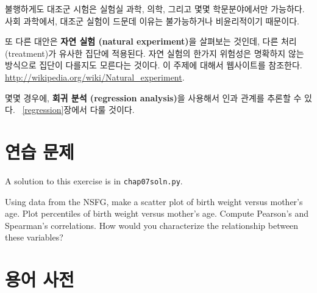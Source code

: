 불행하게도 대조군 시험은 실험실 과학, 의학, 그리고 몇몇 학문분야에서만 가능하다. 사회 과학에서, 대조군 실험이 드문데 이유는 불가능하거나 비윤리적이기 때문이다.

또 다른 대안은 {\bf 자연 실험 (natural experiment)}을 살펴보는 것인데, 다른 처리(treatment)가 유사한 집단에 적용된다. 자연 실험의 한가지 위험성은 명확하지 않는 방식으로 집단이 다를지도 모른다는 것이다.
이 주제에 대해서 웹사이트를 참조한다. \url{http://wikipedia.org/wiki/Natural_experiment}.

몇몇 경우에, {\bf 회귀 분석 (regression analysis)}을 사용해서 인과 관계를 추론할 수 있다. ~\ref{regression}장에서 다룰 것이다.


\section{연습 문제}

A solution to this exercise is in \verb"chap07soln.py".

\begin{exercise}
Using data from the NSFG, make a scatter plot of birth weight
versus mother's age.  Plot percentiles of birth weight
versus mother's age.  Compute Pearson's and Spearman's correlations.
How would you characterize the relationship
between these variables?
\end{exercise}


\section{용어 사전}

